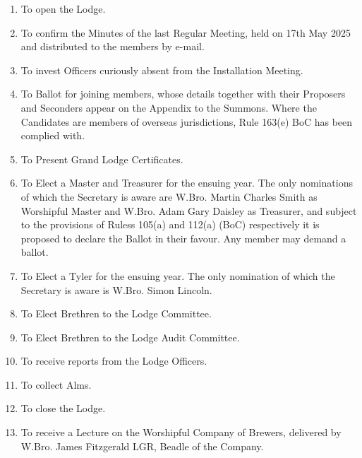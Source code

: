 \begin{enumerate}
  \item To open the Lodge.
  \item To confirm the Minutes of the last Regular Meeting, held on 17th May 2025 and distributed to the members by e-mail.
  \item To invest Officers curiously absent from the Installation Meeting.
  \item To Ballot for joining members, whose details together with their Proposers and Seconders appear on the Appendix to the Summons. Where the Candidates are members of overseas jurisdictions, Rule 163(e) BoC has been complied with.
  \item To Present Grand Lodge Certificates.
  \item To Elect a Master and Treasurer for the ensuing year. The only nominations of which the Secretary is aware are W.Bro. Martin Charles Smith as Worshipful Master and W.Bro. Adam Gary Daisley as Treasurer, and subject to the provisions of  Ruless 105(a) and 112(a) (BoC) respectively it is proposed to declare the Ballot in their favour. Any member may demand a ballot.
  \item To Elect a Tyler for the ensuing year. The only nomination of which the Secretary is aware is W.Bro. Simon Lincoln.
  \item To Elect Brethren to the Lodge Committee.
  \item To Elect Brethren to the Lodge Audit Committee.
  \item To receive reports from the Lodge Officers.
  \item To collect Alms.
  \item To close the Lodge.
  \item To receive a Lecture on the Worshipful Company of Brewers, delivered by W.Bro. James Fitzgerald LGR, Beadle of the Company.
\end{enumerate}